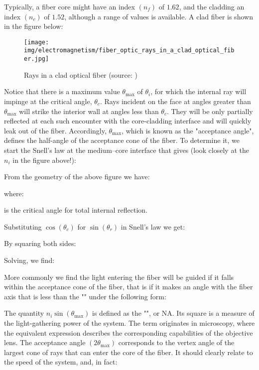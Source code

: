 	Typically, a fiber core might have an index $\left(n_{f}\right)$ of $1.62$, and the cladding an index $\left(n_{c}\right)$ of $1.52$, although a range of values is available. A clad fiber is shown in the figure below:
	\begin{figure}[H]
		\centering
		\texttt{[image: img/electromagnetism/fiber\_optic\_rays\_in\_a\_clad\_optical\_fiber.jpg]}
		\caption[Rays in a clad optical fiber]{Rays in a clad optical fiber (source: \cite{hecht2016optics})}
	\end{figure} 	
	Notice that there is a maximum value $\theta_{\max }$ of $\theta_{i}$, for which the internal ray will impinge at the critical angle, $\theta_{c}$. Rays incident on the face at angles greater than $\theta_{\max}$ will strike the interior wall at angles less than $\theta_{c}$. They will be only partially reflected at each such encounter with the core-cladding interface and will quickly leak out of the fiber. Accordingly, $\theta_{\max}$, which is known as the "acceptance angle", defines the half-angle of the acceptance cone of the fiber. To determine it, we start the Snell's law at the medium–core interface that gives (look closely at the $n_i$ in the figure above!):
	
	From the geometry of the above figure we have:
	
	where:
	
	is the critical angle for total internal reflection.
	
	Substituting $\cos(\theta_c)$ for $\sin(\theta_r)$ in Snell's law we get:
	
	By squaring both sides:
	
	Solving, we find:
	
	More commonly we find the light entering the fiber will be guided if it falls within the acceptance cone of the fiber, that is if it makes an angle with the fiber axis that is less than the "" under the following form:
	
	The quantity $n_{i} \sin (\theta_{\max })$ is defined as the "", or NA. Its square is a measure of the light-gathering power of the system. The term originates in microscopy, where the equivalent expression describes the corresponding capabilities of the objective lens. The acceptance angle $\left(2 \theta_{\max }\right)$ corresponds to the vertex angle of the largest cone of rays that can enter the core of the fiber. It should clearly relate to the speed of the system, and, in fact:
	

